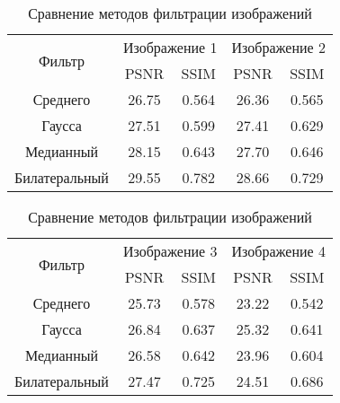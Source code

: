 \begin{table}[ht]
    \caption{Сравнение методов фильтрации изображений}
    \centering
    \begin{tabular}{|c|cc|cc|}
    \hline
    \multirow{2}{*}{Фильтр} & \multicolumn{2}{c|}{Изображение 1} & \multicolumn{2}{c|}{Изображение 2} \\ \cline{2-5} 
     & \multicolumn{1}{c|}{PSNR} & SSIM & \multicolumn{1}{c|}{PSNR} & \multicolumn{1}{c|}{SSIM} \\ \hline
    Среднего & \multicolumn{1}{c|}{26.75} & 0.564 & \multicolumn{1}{c|}{26.36} & 0.565 \\ \hline
    Гаусса & \multicolumn{1}{c|}{27.51} & 0.599 & \multicolumn{1}{c|}{27.41} & 0.629 \\ \hline
    Медианный & \multicolumn{1}{c|}{28.15} & 0.643 & \multicolumn{1}{c|}{27.70} & 0.646 \\ \hline

    \multicolumn{1}{|c|}{Билатеральный} & \multicolumn{1}{c|}{29.55} & \multicolumn{1}{c|}{0.782} & \multicolumn{1}{c|}{28.66} & 0.729 \\ \hline
    \end{tabular}
    \label{tab: comparison1}
\end{table}

\begin{table}[ht]
    \caption{Сравнение методов фильтрации изображений}
    \centering
    \begin{tabular}{|c|cc|cc|}
    \hline
    \multirow{2}{*}{Фильтр} & \multicolumn{2}{c|}{Изображение 3} & \multicolumn{2}{c|}{Изображение 4} \\ \cline{2-5} 
     & \multicolumn{1}{c|}{PSNR} & \multicolumn{1}{c|}{SSIM} & \multicolumn{1}{c|}{PSNR} & \multicolumn{1}{c|}{SSIM} \\ \hline
    Среднего & \multicolumn{1}{c|}{25.73} & 0.578 & \multicolumn{1}{c|}{23.22} & 0.542 \\ \hline
    Гаусса & \multicolumn{1}{c|}{26.84} & 0.637 & \multicolumn{1}{c|}{25.32} & 0.641 \\ \hline
    Медианный & \multicolumn{1}{c|}{26.58} & 0.642 & \multicolumn{1}{c|}{23.96} & 0.604 \\ \hline
    \multicolumn{1}{|c|}{Билатеральный}  & \multicolumn{1}{c|}{27.47} & 0.725 & \multicolumn{1}{c|}{24.51} & 0.686 \\ \hline
    \end{tabular}
    \label{tab: comparison2}
\end{table}

